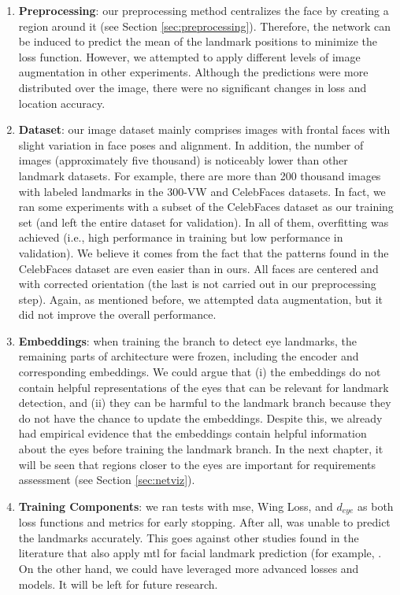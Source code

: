 \begin{enumerate}[i]
\item \textbf{Preprocessing}: our preprocessing method centralizes the face by creating a region around it (see Section \ref{sec:preprocessing}). Therefore, the network can be induced to predict the mean of the landmark positions to minimize the loss function. However, we attempted to apply different levels of image augmentation in other experiments. Although the predictions were more distributed over the image, there were no significant changes in loss and location accuracy.
 
\item \textbf{Dataset}: our \adhoc image dataset mainly comprises images with frontal faces with slight variation in face poses and alignment. In addition, the number of images (approximately five thousand) is noticeably lower than other landmark datasets. For example, there are more than 200 thousand images with labeled landmarks in the 300-VW \citep{tzimiropoulos2015project} and CelebFaces \citep{yang2015facial} datasets. In fact, we ran some experiments with a subset of the CelebFaces dataset as our training set (and left the entire \adhoc dataset for validation). In all of them, overfitting was achieved (i.e., high performance in training but low performance in validation). We believe it comes from the fact that the patterns found in the CelebFaces dataset are even easier than in ours. All faces are centered and with corrected orientation (the last is not carried out in our preprocessing step). Again, as mentioned before, we attempted data augmentation, but it did not improve the overall performance.
 
\item \textbf{Embeddings}: when training the branch to detect eye landmarks, the remaining parts of \methodname architecture were frozen, including the encoder and corresponding embeddings. We could argue that (i) the embeddings do not contain helpful representations of the eyes that can be relevant for landmark detection, and (ii) they can be harmful to the landmark branch because they do not have the chance to update the embeddings. Despite this, we already had empirical evidence that the embeddings contain helpful information about the eyes before training the landmark branch. In the next chapter, it will be seen that regions closer to the eyes are important for requirements assessment (see Section \ref{sec:netviz}).
 
\item \textbf{Training Components}: we ran tests with \acs{mse}, Wing Loss, and $d_{eye}$ as both loss functions and metrics for early stopping. After all, \methodname was unable to predict the landmarks accurately. This goes against other studies found in the literature that also apply \acs{mtl} for facial landmark prediction (for example, \citep{zhang2014facial, ranjan2017hyperface, zhang2015learning}. On the other hand, we could have leveraged more advanced losses and models. It will be left for future research.
 
\end{enumerate}
 
